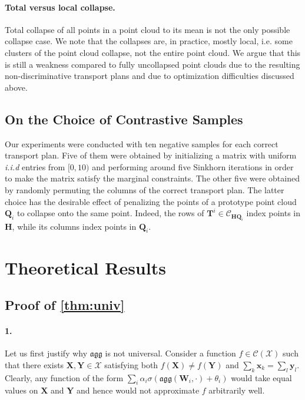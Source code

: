 \documentclass[letterpaper]{article} \usepackage{aaai22}  \usepackage{times}  \usepackage{helvet}  \usepackage{courier}  \usepackage[hyphens]{url}  \usepackage{graphicx} \urlstyle{rm} \def\UrlFont{\rm}  \usepackage{natbib}  \usepackage{caption} \DeclareCaptionStyle{ruled}{labelfont=normalfont,labelsep=colon,strut=off} \frenchspacing  \setlength{\pdfpagewidth}{8.5in}  \setlength{\pdfpageheight}{11in}  \usepackage{algorithm}
\newcommand{\x}{{\mathbf x}}
\newcommand{\T}{{\mathbf T}}
\newcommand{\X}{{\mathbf X}}
\newcommand{\Q}{{\mathbf Q}}
\begin{document}
\paragraph{Total versus local collapse.} Total collapse of all points in a point cloud to its mean is not the only possible collapse case. We note that the collapses are, in practice, mostly local, i.e. some clusters of the point cloud collapse, not the entire point cloud. We argue that this is still a weakness compared to fully uncollapsed point clouds due to the resulting non-discriminative transport plans and due to optimization difficulties discussed above.

\subsection{On the Choice of Contrastive Samples}\label{sec:contrastive-samples}

Our experiments were conducted with ten negative samples for each correct transport plan. Five of them were obtained by initializing a matrix with uniform \textit{i.i.d} entries from $[0,10)$ and performing around five Sinkhorn iterations \citep{cuturi2013sinkhorn} in order to make the matrix satisfy the marginal constraints. The other five were obtained by randomly permuting the columns of the correct transport plan. The latter choice has the desirable effect of penalizing the points of a prototype point cloud $\Q_i$ to collapse onto the same point. Indeed, the rows of $\T^i\in\mathcal{C}_{\mathbf{H} \Q_i}$ index points in $\mathbf{H}$, while its columns index points in $\Q_i$. 

\section{Theoretical Results}

\subsection{Proof of \cref{thm:univ}}\label{sec:proof-univ}

\paragraph{1.} Let us first justify why $\mathfrak{agg}$ is not universal. Consider a function $f\in\mathcal{C}(\mathcal{X})$ such that there exists $\X,\mathbf Y\in\mathcal{X}$ satisfying both $f(\X)\neq f(\mathbf Y)$ and $\sum_k \x_k=\sum_l \mathbf y_l$. Clearly, any function of the form $\sum_i \alpha_i\sigma(\mathfrak{agg}(\mathbf W_i,\cdot)+\theta_i)$ would take equal values on $\X$ and $\mathbf Y$ and hence would not approximate $f$ arbitrarily well.
\end{document}
